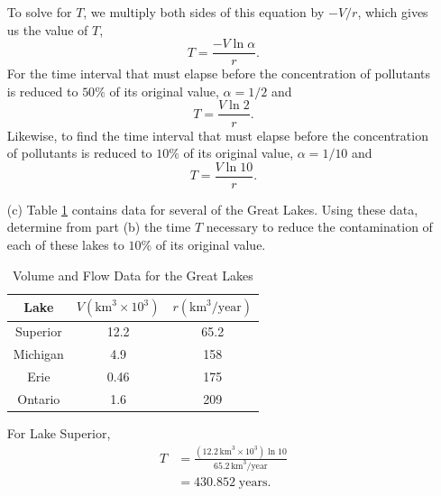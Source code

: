 \begin{ex}
\begin{enumerate}
\begin{sol}
          To solve for $T$, we multiply both sides of this equation by $-V/r$, which gives us the value of $T$,
          \begin{equation}
            T = \frac{-V\ln{\alpha}}{r}.
            \label{tsol}
          \end{equation}
          For the time interval that must elapse before the concentration of pollutants is reduced to $50\%$ of its original value, $\alpha=1/2$ and
          \begin{equation}
            T=\frac{V\ln2}{r}.
          \end{equation}
          Likewise, to find the time interval that must elapse before the concentration of pollutants is reduced to $10\%$ of its original value, $\alpha=1/10$ and
          \begin{equation}
            T=\frac{V \ln{10}}{r}.
          \end{equation}
        \end{sol}
      \item[(c)]
        Table \ref{tab:volflow} contains data for several of the Great Lakes.
        Using these data, determine from part (b) the time $T$ necessary to reduce the contamination of each of these lakes
        to $10\%$ of its original value.
        \begin{table}[H]
          \begin{center}
            \begin{tabular}{ccc}
              \hline
              Lake & $V(\text{km}^3\times 10^3)$ & $r(\text{km}^3/\text{year})$ \\ \hline
              Superior & 12.2 & 65.2 \\
              Michigan & 4.9 & 158 \\
              Erie & 0.46 & 175 \\
              Ontario & 1.6 & 209 \\ \hline
            \end{tabular}
            \caption{Volume and Flow Data for the Great Lakes}
          \end{center}
          \label{tab:volflow}
        \end{table}
        \begin{sol}
          For Lake Superior,
          \begin{align*}
            T&=\frac{\left(12.2\, \text{km}^3 \times 10^3\right) \ln{10}}{65.2\, \text{km}^3/\text{year}} \\
            &=430.852\; \text{years}.
          \end{align*}


\end{sol}
\end{enumerate}
\end{ex}
